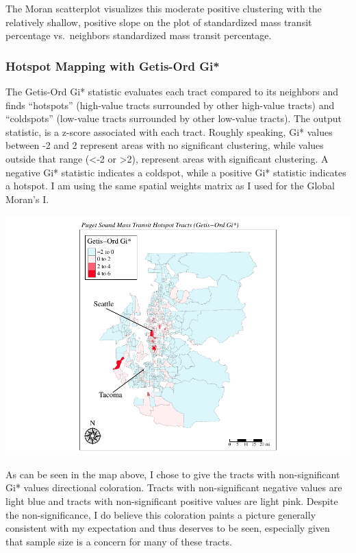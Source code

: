 \documentclass[
]{article}
\begin{document}
The Moran scatterplot visualizes this moderate positive clustering with
the relatively shallow, positive slope on the plot of standardized mass
transit percentage vs.~neighbors standardized mass transit percentage.

\newpage

\subsubsection{Hotspot Mapping with Getis-Ord
Gi*}\label{hotspot-mapping-with-getis-ord-gi}

The Getis-Ord Gi* statistic evaluates each tract compared to its
neighbors and finds ``hotspots'' (high-value tracts surrounded by other
high-value tracts) and ``coldspots'' (low-value tracts surrounded by
other low-value tracts). The output statistic, is a z-score associated
with each tract. Roughly speaking, Gi* values between -2 and 2 represent
areas with no significant clustering, while values outside that range
(\textless-2 or \textgreater2), represent areas with significant
clustering. A negative Gi* statistic indicates a coldspot, while a
positive Gi* statistic indicates a hotspot. I am using the same spatial
weights matrix as I used for the Global Moran's I.

\includegraphics{transit-hotspots-PSRC_files/figure-latex/unnamed-chunk-12-1.pdf}

As can be seen in the map above, I chose to give the tracts with
non-significant Gi* values directional coloration. Tracts with
non-significant negative values are light blue and tracts with
non-significant positive values are light pink. Despite the
non-significance, I do believe this coloration paints a picture
generally consistent with my expectation and thus deserves to be seen,
especially given that sample size is a concern for many of these tracts.
\end{document}

